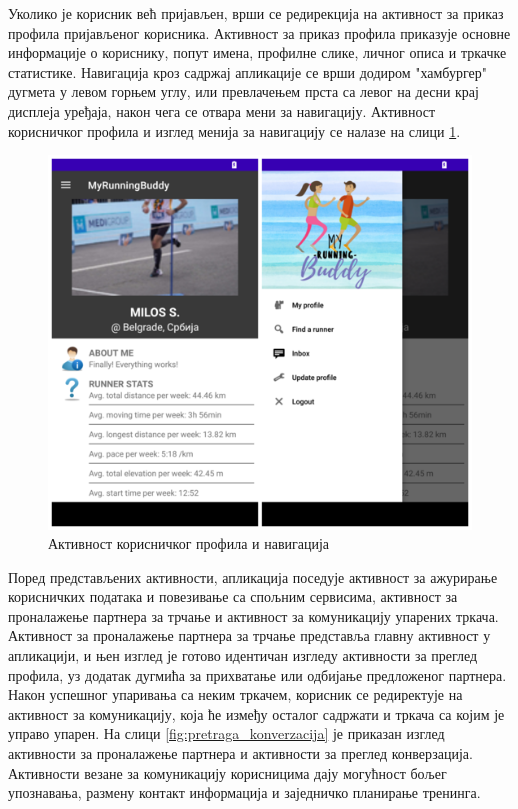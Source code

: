 \documentclass[12pt,oneside]{memoir}
\begin{document}
Уколико је корисник већ пријављен, врши се редирекција на активност за приказ профила пријављеног корисника. Активност за приказ профила приказује основне информације о кориснику, попут имена, профилне слике, личног описа и тркачке статистике. Навигација кроз садржај апликације се врши додиром "хамбургер" дугмета у левом горњем углу, или превлачењем прста са левог на десни крај дисплеја уређаја, након чега се отвара мени за навигацију. Активност корисничког профила и изглед менија за навигацију се налазе на слици \ref{fig:profil_meni}.

\begin{figure}[!ht]
  \centering
  \includegraphics[scale=0.7]{slike/profil-meni.png}
  \caption{Активност корисничког профила и навигација}
  \label{fig:profil_meni}
\end{figure}

Поред представљених активности, апликација поседује активност за ажурирање корисничких података и повезивање са спољним сервисима, активност за проналажење партнера за трчање и активност за комуникацију упарених тркача. Активност за проналажење партнера за трчање представља главну активност у апликацији, и њен изглед је готово идентичан изгледу активности за преглед профила, уз додатак дугмића за прихватање или одбијање предложеног партнера. Након успешног упаривања са неким тркачем, корисник се редиректује на активност за комуникацију, која ће између осталог садржати и тркача са којим је управо упарен. На слици \ref{fig:pretraga_konverzacija} је приказан изглед активности за проналажење партнера и активности за преглед конверзација. Активности везане за комуникацију корисницима дају могућност бољег упознавања, размену контакт информација и заједничко планирање тренинга.
\end{document}
